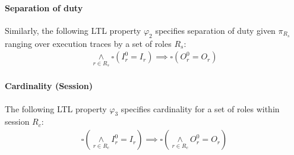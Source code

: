 \paragraph{Separation of duty} Similarly, the following LTL property $\varphi_2$ specifies separation of duty given $\pi_{R_s}$ ranging over execution traces by a set of roles $R_s$:
\begin{align*}
	\underset{r\in R_s }{\land} \square (I_{r}^{0} = I_{r})\implies \square (O_{r}^{0} = O_{r})
\end{align*}



\paragraph{Cardinality (Session)} The following LTL property $\varphi_3$ specifies cardinality for a set of roles within session $R_c$:
\begin{align*}
	\square (\underset{r\in R_c }{\land} I_{r}^{0} = I_{r})\implies \square ( \underset{r\in R_c }{\land} O_{r}^{0} = O_{r})
\end{align*}


